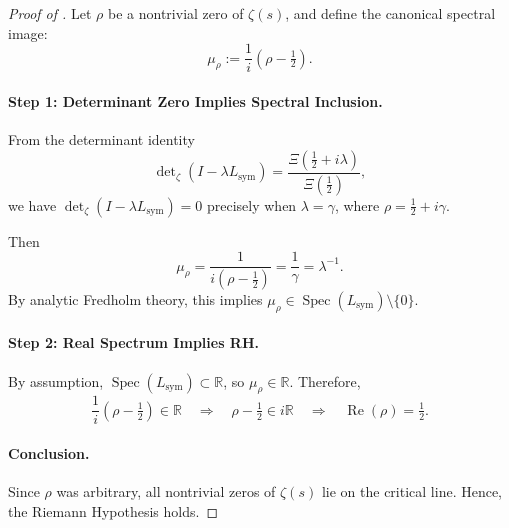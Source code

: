 \begin{proof}[Proof of ]
Let \( \rho \) be a nontrivial zero of \( \zeta(s) \), and define the canonical spectral image:
\[
\mu_\rho := \frac{1}{i}(\rho - \tfrac{1}{2}).
\]

\paragraph{Step 1: Determinant Zero Implies Spectral Inclusion.}
From the determinant identity
\[
\det\nolimits_\zeta(I - \lambda L_{\mathrm{sym}}) = \frac{\Xi\left( \tfrac{1}{2} + i\lambda \right)}{\Xi\left( \tfrac{1}{2} \right)},
\]
we have \( \det\nolimits_\zeta(I - \lambda L_{\mathrm{sym}}) = 0 \) precisely when \( \lambda = \gamma \), where \( \rho = \tfrac{1}{2} + i\gamma \).

Then
\[
\mu_\rho = \frac{1}{i(\rho - \tfrac{1}{2})} = \frac{1}{\gamma} = \lambda^{-1}.
\]
By analytic Fredholm theory, this implies \( \mu_\rho \in \operatorname{Spec}(L_{\mathrm{sym}}) \setminus \{0\} \).

\paragraph{Step 2: Real Spectrum Implies RH.}
By assumption, \( \operatorname{Spec}(L_{\mathrm{sym}}) \subset \mathbb{R} \), so \( \mu_\rho \in \mathbb{R} \). Therefore,
\[
\frac{1}{i}(\rho - \tfrac{1}{2}) \in \mathbb{R} \quad \Rightarrow \quad \rho - \tfrac{1}{2} \in i\mathbb{R} \quad \Rightarrow \quad \operatorname{Re}(\rho) = \tfrac{1}{2}.
\]

\paragraph{Conclusion.}
Since \( \rho \) was arbitrary, all nontrivial zeros of \( \zeta(s) \) lie on the critical line. Hence, the Riemann Hypothesis holds.
\end{proof}
